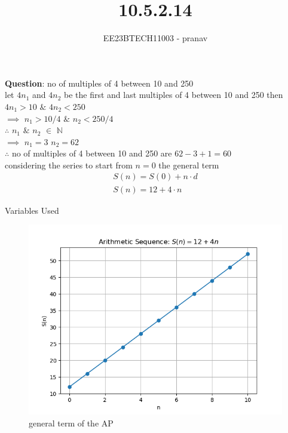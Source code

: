 \documentclass[journal,12pt,twocolumn]{IEEEtran}
\theoremstyle{remark}
\begin{document}

\vspace{3cm}

\title{10.5.2.14}
\author{EE23BTECH11003 - pranav}
\maketitle
\newpage

\bigskip


\textbf{Question}:
no of multiples of 4 between 10 and 250
\\let $4n_{1}$ and $4n_{2}$ be the first and last multiples of 4 between 10 and 250 then\\ 

 $4n_{1}>10$  $\&$ $4n_{2}<250$  \\
 $\implies$ $n_{1}>10/4$ $\&$ $n_{2}<250/4$\\
$ \therefore$ $n_{1}$ $\&$ $n_{2}$ $\in$ $\mathbb{N}$\\
 $\implies$ $n_{1}=3$ $n_{2}=62$ \\
 $\therefore$ no of multiples of 4 between 10 and 250 are $62-3+1=60$ \\
considering the series to start from $n=0$ the general term
\begin{align}
S(n)=S(0)+n\cdot d\\
S(n)=12+4\cdot n
\end{align}
\begin{table}[h]
    \centering
    
    \caption{Variables Used}
    \label{tab	: 10.5.2.14}
\end{table}
\begin{figure}[h!]
    \centering
    \includegraphics[width=1.1\linewidth]{figs/graph1.png}
    \caption{general term of the AP}
    \label{fig:enter-label}
\end{figure}
\end{document}
